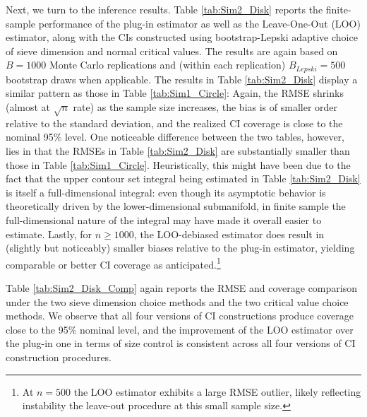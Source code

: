 \documentclass[12pt,american]{article}
\theoremstyle{definition}
\theoremstyle{plain}
\theoremstyle{definition}
\theoremstyle{plain}
\theoremstyle{plain}
\theoremstyle{plain}
\theoremstyle{plain}
\theoremstyle{plain}
\begin{document}
Next, we turn to the inference results. Table \ref{tab:Sim2_Disk} reports the finite-sample performance of the plug-in estimator as well as the Leave-One-Out (LOO) estimator, along with the CIs constructed using bootstrap-Lepski adaptive choice of sieve dimension and normal critical values. The results are again based on $B= 1000$ Monte Carlo replications and (within each replication) $B_{Lepski} = 500$ bootstrap draws when applicable. The results in Table \ref{tab:Sim2_Disk} display a similar pattern as those in Table \ref{tab:Sim1_Circle}: Again, the RMSE shrinks (almost at $\sqrt{n}$ rate) as the sample size increases, the bias is of smaller order relative to the standard deviation, and the realized CI coverage is close to the nominal 95\% level. One noticeable difference between the two tables, however, lies in that the RMSEs in Table \ref{tab:Sim2_Disk} are substantially smaller than those in Table \ref{tab:Sim1_Circle}. Heuristically, this might have been due to the fact that the upper contour set integral being estimated in Table \ref{tab:Sim2_Disk} is itself a full-dimensional integral: even though its asymptotic behavior is theoretically driven by the lower-dimensional submanifold, in finite sample the full-dimensional nature of the integral may have made it overall easier to estimate. Lastly, for $n\geq 1000$, the LOO-debiased estimator does result in (slightly but noticeably) smaller biases relative to the plug-in estimator, yielding comparable or better CI coverage as anticipated.\footnote{At $n=500$ the LOO estimator exhibits a large RMSE outlier, likely reflecting instability the leave-out procedure at this small sample size.}

Table \ref{tab:Sim2_Disk_Comp} again reports the RMSE and coverage comparison under the two sieve dimension choice methods and the two critical value choice methods. We observe that all four versions of CI constructions produce coverage close to the 95\% nominal level, and the improvement of the LOO estimator over the plug-in one in terms of size control is consistent across all four versions of CI construction procedures.
\end{document}
